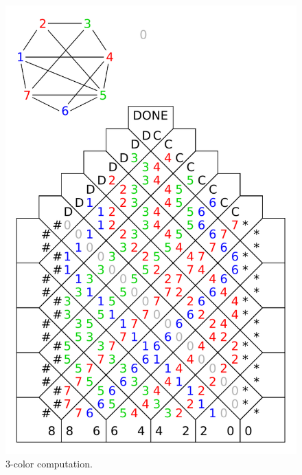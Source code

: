 \begin{figure}[H]
\begin{center}
	\includegraphics[scale=0.75]{./figures/3-color/3-color.pdf}
	\caption{3-color computation.}
	\label{fig:3-color}
\end{center}
\end{figure}
